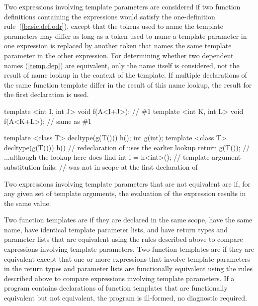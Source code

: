 \pnum
{}%
Two expressions involving template parameters are considered
if two function definitions containing the expressions would satisfy
the one-definition rule~(\ref{basic.def.odr}), except that the tokens used
to name the template parameters may differ as long as a token used to
name a template parameter in one expression is replaced by another token
that names the same template parameter in the other expression. For
determining whether two dependent names (\ref{temp.dep}) are
equivalent, only the name itself is considered, not the result of name
lookup in the context of the template. If multiple declarations of the
same function template differ in the result of this name lookup, the
result for the first declaration is used.
\begin{example}

\begin{codeblock}
template <int I, int J> void f(A<I+J>);         // \#1
template <int K, int L> void f(A<K+L>);         // same as \#1

template <class T> decltype(g(T())) h();
int g(int);
template <class T> decltype(g(T())) h()         // redeclaration of  uses the earlier lookup
  { return g(T()); }                            // ...although the lookup here does find 
int i = h<int>();                               // template argument substitution fails; 
                                                // was not in scope at the first declaration of 
\end{codeblock}
\end{example}
%
%
Two expressions involving template parameters that are not equivalent are
if, for any given set of template arguments, the evaluation of the
expression results in the same value.

\pnum
{}%
Two function templates are
if they are declared in the same scope, have the same name, have
identical template parameter lists, and have return types and parameter
lists that are equivalent using the rules described above to compare
expressions involving
template parameters.
%
%
Two function templates are
if they are equivalent except that one or more
expressions
that involve template parameters in the return types and parameter
lists are functionally equivalent using the rules described above to
compare expressions involving
template parameters.
If a program contains declarations of function templates that are
functionally equivalent but not equivalent, the program is ill-formed,
no diagnostic required.

